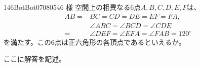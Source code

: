 \begin{prob}{146}{}{BotBot07080546 様}
 空間上の相異なる6点$A, B, C, D, E, F$は、
 \begin{align*}
  AB=&BC=CD=DE=EF=FA, \\
  &\angle{ABC}=\angle{BCD}=\angle{CDE} \\
  =&\angle{DEF}=\angle{EFA}=\angle{FAB}=120^\circ
 \end{align*}
 を満たす。この6点は正六角形の各頂点であるといえるか。
\end{prob}
ここに解答を記述。
